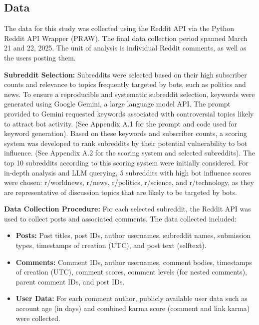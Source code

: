 \documentclass[
  12pt,
  letterpaper,
  DIV=11,
  numbers=noendperiod]{scrartcl}
\providecommand{\tightlist}{%
  \setlength{\itemsep}{0pt}\setlength{\parskip}{0pt}}\usepackage{longtable,booktabs,array}
\begin{document}
\subsection{Data}\label{data}

The data for this study was collected using the Reddit API via the
Python Reddit API Wrapper (PRAW). The final data collection period
spanned March 21 and 22, 2025. The unit of analysis is individual Reddit
comments, as well as the users posting them.

\textbf{Subreddit Selection:} Subreddits were selected based on their
high subscriber counts and relevance to topics frequently targeted by
bots, such as politics and news. To ensure a reproducible and systematic
subreddit selection, keywords were generated using Google Gemini, a
large language model API. The prompt provided to Gemini requested
keywords associated with controversial topics likely to attract bot
activity. (See Appendix A.1 for the prompt and code used for keyword
generation). Based on these keywords and subscriber counts, a scoring
system was developed to rank subreddits by their potential vulnerability
to bot influence. (See Appendix A.2 for the scoring system and selected
subreddits). The top 10 subreddits according to this scoring system were
initially considered. For in-depth analysis and LLM querying, 5
subreddits with high bot influence scores were chosen: r/worldnews,
r/news, r/politics, r/science, and r/technology, as they are
representative of discussion topics that are likely to be targeted by
bots.

\textbf{Data Collection Procedure:} For each selected subreddit, the
Reddit API was used to collect posts and associated comments. The data
collected included:

\begin{itemize}
\tightlist
\item
  \textbf{Posts:} Post titles, post IDs, author usernames, subreddit
  names, submission types, timestamps of creation (UTC), and post text
  (selftext).
\item
  \textbf{Comments:} Comment IDs, author usernames, comment bodies,
  timestamps of creation (UTC), comment scores, comment levels (for
  nested comments), parent comment IDs, and post IDs.
\item
  \textbf{User Data:} For each comment author, publicly available user
  data such as account age (in days) and combined karma score (comment
  and link karma) were collected.
\end{itemize}
\end{document}
